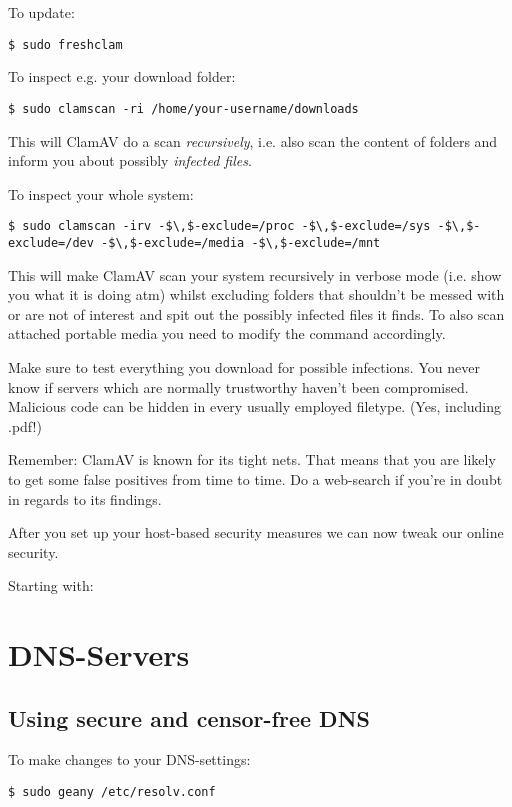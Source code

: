 \documentclass{article}
\begin{document}
 To update:
\begin{lstlisting}
$ sudo freshclam
\end{lstlisting}



 To inspect e.g. your download folder:
\begin{lstlisting}
$ sudo clamscan -ri /home/your-username/downloads
\end{lstlisting}



 This will ClamAV do a scan \emph{recursively}, i.e. also scan the content of folders and inform you about possibly \emph{infected files}.


 To inspect your whole system:
\begin{lstlisting}
$ sudo clamscan -irv -$\,$-exclude=/proc -$\,$-exclude=/sys -$\,$-exclude=/dev -$\,$-exclude=/media -$\,$-exclude=/mnt 
\end{lstlisting}



 This will make ClamAV scan your system recursively in verbose mode (i.e. show you what it is doing atm) whilst excluding folders that shouldn't be messed with or are not of interest and spit out the possibly infected files it finds. To also scan attached portable media you need to modify the command accordingly.


 Make sure to test everything you download for possible infections. You never know if servers which are normally trustworthy haven't been compromised. Malicious code can be hidden in every usually employed filetype. (Yes, including .pdf!)


 Remember: ClamAV is known for its tight nets. That means that you are likely to get some false positives from time to time. Do a web-search if you're in doubt in regards to its findings. 


 After you set up your host-based security measures we can now tweak our online security. 


 Starting with: 
\section{DNS-Servers}
\subsection{Using secure and censor-free DNS}


 To make changes to your DNS-settings:
\begin{lstlisting}
$ sudo geany /etc/resolv.conf
\end{lstlisting}
\end{document}
